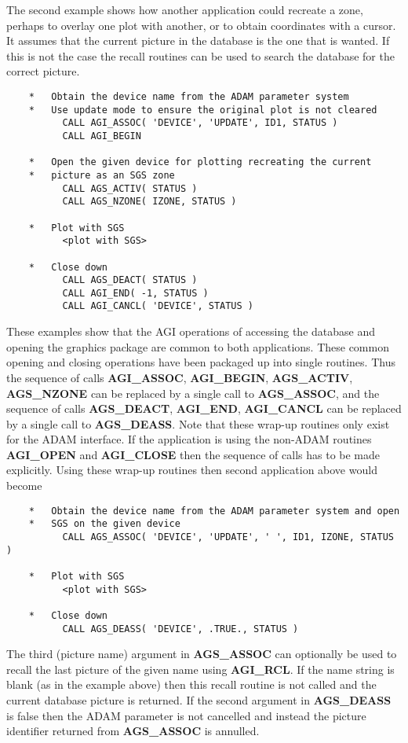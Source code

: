 The second example shows how another application could recreate a zone,
perhaps to overlay one plot with another, or to obtain coordinates with
a cursor. It assumes that the current picture in the database is the one
that is wanted. If this is not the case the recall routines can be used
to search the database for the correct picture.
\begin{verbatim}
    *   Obtain the device name from the ADAM parameter system
    *   Use update mode to ensure the original plot is not cleared
          CALL AGI_ASSOC( 'DEVICE', 'UPDATE', ID1, STATUS )
          CALL AGI_BEGIN

    *   Open the given device for plotting recreating the current
    *   picture as an SGS zone
          CALL AGS_ACTIV( STATUS )
          CALL AGS_NZONE( IZONE, STATUS )

    *   Plot with SGS
          <plot with SGS>

    *   Close down
          CALL AGS_DEACT( STATUS )
          CALL AGI_END( -1, STATUS )
          CALL AGI_CANCL( 'DEVICE', STATUS )
\end{verbatim}

These examples show that the AGI operations of accessing the database and
opening the graphics package are common to both applications. These
common opening and closing operations have been packaged up into single
routines. Thus the sequence of calls {\bf AGI\_ASSOC}, {\bf AGI\_BEGIN},
{\bf AGS\_ACTIV}, {\bf AGS\_NZONE} can be replaced by a single call to
{\bf AGS\_ASSOC}, and the sequence of calls {\bf AGS\_DEACT},
{\bf AGI\_END}, {\bf AGI\_CANCL} can be replaced by a single call to
{\bf AGS\_DEASS}. Note that these wrap-up routines only exist for the
ADAM interface. If the application is using the non-ADAM routines
{\bf AGI\_OPEN} and {\bf AGI\_CLOSE} then the sequence of calls has to
be made explicitly. Using these wrap-up routines then second application
above would become
\begin{verbatim}
    *   Obtain the device name from the ADAM parameter system and open
    *   SGS on the given device
          CALL AGS_ASSOC( 'DEVICE', 'UPDATE', ' ', ID1, IZONE, STATUS )

    *   Plot with SGS
          <plot with SGS>

    *   Close down
          CALL AGS_DEASS( 'DEVICE', .TRUE., STATUS )
\end{verbatim}
The third (picture name) argument in {\bf AGS\_ASSOC} can optionally be
used to recall the last picture of the given name using {\bf AGI\_RCL}.
If the name string is blank (as in the example above) then this recall
routine is not called and the current database picture is returned.
If the second argument in {\bf AGS\_DEASS} is false then the ADAM parameter
is not cancelled and instead the picture identifier returned from
{\bf AGS\_ASSOC} is annulled.

